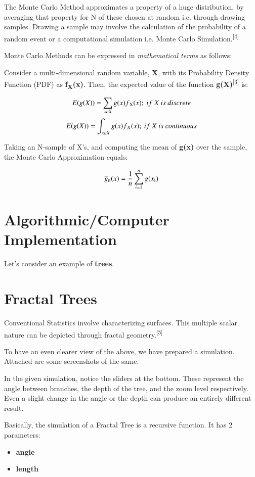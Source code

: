 \documentclass{resonance}
\begin{document}
The Monte Carlo Method approximates a property of a huge distribution, by averaging that property for N of these chosen at random i.e. through drawing samples. Drawing a sample may involve the calculation of the probability of a random event or a computational simulation i.e. Monte Carlo Simulation.\textsuperscript{[4]}

Monte Carlo Methods can be expressed in \textit{mathematical terms} as follows:

Consider a multi-dimensional random variable, \textbf{X}, with its Probability Density Function (PDF) as \textbf{f\textsubscript{X}(x)}. Then, the expected value of the function \textbf{g(X)}\textsuperscript{[3]} is:

$$E(g(X)) = \sum_{x\varepsilon X} g(x)f\textsubscript{X}(x);\ if\ X\ is\ discrete$$
$$E(g(X)) = \int_{x\varepsilon X} g(x)f\textsubscript{X}(x);\ if\ X\ is\ continuous$$

Taking an N-sample of X’s, and computing the mean of \textbf{g(x)} over the sample, the Monte Carlo Approximation equals:

$$ \overline{g}\textsubscript{n}(x) = \frac{1}{n} \sum_{i=1}^{n}g(x\textsubscript{i}) $$

\section*{Algorithmic/Computer Implementation}
Let's consider an example of \textbf{trees}.


\setlength{\leftskip}{0cm}
\section{Fractal Trees}

Conventional Statistics involve characterizing surfaces. This multiple scalar nature can be depicted through fractal geometry.\textsuperscript{[5]}

To have an even clearer view of the above, we have prepared a simulation. Attached are some screenshots of the same.

In the given simulation, notice the sliders at the bottom. These represent the angle between branches, the depth of the tree, and the zoom level respectively. Even a slight change in the angle or the depth can produce an entirely different result.

Basically, the simulation of a Fractal Tree is a recursive function. It has 2 parameters:
\begin{itemize}
    \item \textbf{angle}
    \item \textbf{length}
\end{itemize}
\end{document}
